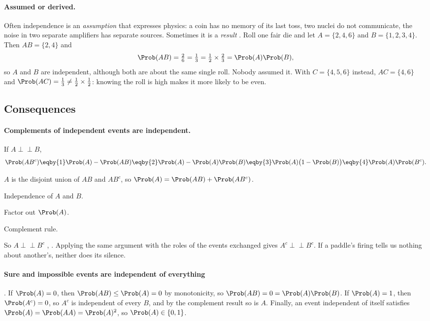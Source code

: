 \paragraph{Assumed or derived.} Often independence is an \emph{assumption} that
expresses physics: a coin has no memory of its last toss, two nuclei do not
communicate, the noise in two separate amplifiers has separate sources.
Sometimes it is a \emph{result} . Roll one fair die and let
$A=\{2,4,6\}$ and $B=\{1,2,3,4\}$. Then $AB=\{2,4\}$ and
\[
\Prob(AB)=\tfrac26=\tfrac13=\tfrac12\times\tfrac23=\Prob(A)\Prob(B),
\]
so $A$ and $B$ are independent, although both are about the same single roll.
Nobody assumed it. With $C=\{4,5,6\}$ instead, $AC=\{4,6\}$ and
$\Prob(AC)=\tfrac13\neq\tfrac12\times\tfrac12$: knowing the roll is high makes it more
likely to be even.

\subsection{Consequences}

\paragraph{Complements of independent events are independent.}
If $A\perp\!\!\!\perp B$,
\begin{align*}
\Prob(AB^c)\eqby{1}\Prob(A)-\Prob(AB)\eqby{2}\Prob(A)-\Prob(A)\Prob(B)\eqby{3}\Prob(A)\bigl(1-\Prob(B)\bigr)
\eqby{4}\Prob(A)\Prob(B^c).
\end{align*}
\begin{explain}
  \item $A$ is the disjoint union of $AB$ and $AB^c$, so $\Prob(A)=\Prob(AB)+\Prob(AB^c)$.
  \item Independence of $A$ and $B$.
  \item Factor out $\Prob(A)$.
  \item Complement rule.
\end{explain}
So $A\perp\!\!\!\perp B^c$ , . Applying the same argument with the roles of the events
exchanged gives $A^c\perp\!\!\!\perp B^c$. If a paddle's firing tells us nothing
about another's, neither does its silence.

\paragraph{Sure and impossible events are independent of everything}
. If $\Prob(A)=0$, then $\Prob(AB)\le\Prob(A)=0$ by
monotonicity, so $\Prob(AB)=0=\Prob(A)\Prob(B)$. If $\Prob(A)=1$, then $\Prob(A^c)=0$, so $A^c$
is independent of every $B$, and by the complement result so is $A$. Finally,
an event independent of itself satisfies $\Prob(A)=\Prob(AA)=\Prob(A)^2$, so
$\Prob(A)\in\{0,1\}$.

